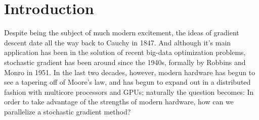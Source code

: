 \section{Introduction}

Despite being the subject of much modern excitement, the ideas of gradient
descent date all the way back to Cauchy in 1847. And although it's main
application has been in the solution of recent big-data optimization problems,
stochastic gradient has been around since the 1940s, formally by Robbins and
Monro in 1951. In the last two decades, however, modern hardware has begun to
see a tapering off of Moore's law, and has begun to expand out in a distributed
fashion with multicore processors and GPUs; naturally the question becomes: In
order to take advantage of the strengths of modern hardware, how can we
parallelize a stochastic gradient method?
